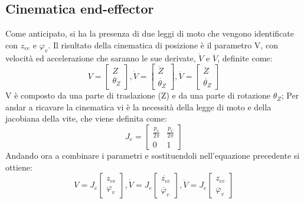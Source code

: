 \subsection{Cinematica end-effector}
Come anticipato, si ha la presenza di due leggi di moto che vengono identificate con $z_{ee}$ e $\varphi_v$. Il risultato della cinematica di posizione è il parametro V, con velocità ed accelerazione che saranno le sue derivate, $\dot{V}$ e $\ddot{V}$, definite come: 
\begin{equation*}
	V = 
	\begin{bmatrix}
		Z \\ 
		\theta_Z
	\end{bmatrix}, 
	\dot{V} = 
	\begin{bmatrix}
		\dot{Z} \\ \dot{\theta_Z}
	\end{bmatrix},
	\ddot{V} =
	\begin{bmatrix}
		\ddot{Z} \\ \ddot{\theta_Z}
	\end{bmatrix}
\end{equation*}
V è composto da una parte di traslazione (Z) e da una parte di rotazione $\theta_Z$; Per andar a ricavare la cinematica vi è la necessità della legge di moto e della jacobiana della vite, che viene definita come:
\begin{equation}
J_e =
    \begin{bmatrix}
    \frac{p_v}{2 \pi} & \frac{p_v}{2 \pi} \\
    0 & 1
    \end{bmatrix}
\end{equation}
Andando ora a combinare i parametri e sostituendoli nell'equazione precedente si ottiene:
\begin{equation}
    V = J_e \begin{bmatrix}
    z_{ee} \\ \varphi_v
    \end{bmatrix},
    \dot{V} = J_e \begin{bmatrix}
    \dot{z_{ee}} \\ \dot{\varphi_v}
    \end{bmatrix},
    \ddot{V} = J_e \begin{bmatrix}
    \ddot{z_{ee}} \\ \ddot{\varphi_v}
    \end{bmatrix}
\end{equation}

